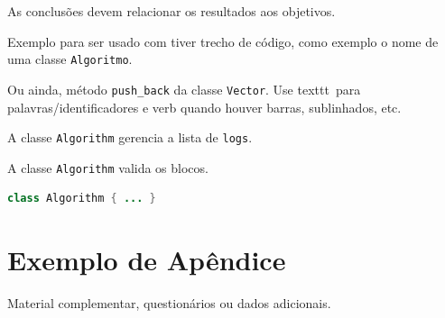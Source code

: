 \documentclass[12pt,oneside]{article}
\newcommand{\code}[1]{\texttt{#1}}
\begin{document}
As conclusões devem relacionar os resultados aos objetivos. 

Exemplo para ser usado com tiver trecho de código, como exemplo o nome de uma
classe \texttt{Algoritmo}.

Ou ainda, método \verb|push_back| da classe \texttt{Vector}. Use texttt\ para
palavras/identificadores e verb quando houver barras, sublinhados, etc.

A classe \code{Algorithm} gerencia a lista de \code{logs}.

A classe \lstinline!Algorithm! valida os blocos.

\begin{lstlisting}[language=Java, caption={Exemplo de classe}, label={lst:ex}]
class Algorithm { ... }
\end{lstlisting}

\printbibliography

\appendix
\renewcommand{\thesection}{Apêndice \Alph{section}}

\section{Exemplo de Apêndice}\label{sec:apendiceA}
Material complementar, questionários ou dados adicionais.
\end{document}
